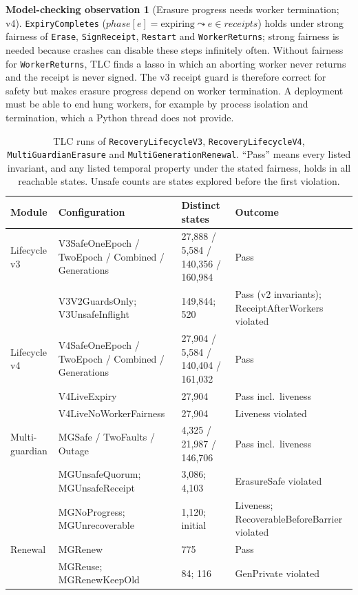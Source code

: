 \documentclass[pdflatex,sn-mathphys-num]{sn-jnl}
\theoremstyle{plain}
\theoremstyle{definition}
\newtheorem{observation}{Model-checking observation}
\newcommand{\code}[1]{\texttt{#1}}
\begin{document}
\begin{observation}[Erasure progress needs worker termination; v4]\label{obs:liveness}
\code{ExpiryCompletes} ($\mathit{phase}[e]=\text{expiring}\leadsto e\in\mathit{receipts}$) holds under strong fairness of \code{Erase}, \code{SignReceipt}, \code{Restart} and \code{WorkerReturns}; strong fairness is needed because crashes can disable these steps infinitely often. Without fairness for \code{WorkerReturns}, TLC finds a lasso in which an aborting worker never returns and the receipt is never signed. The v3 receipt guard is therefore correct for safety but makes erasure progress depend on worker termination. A deployment must be able to end hung workers, for example by process isolation and termination, which a Python thread does not provide.
\end{observation}

\begin{table}[htbp]
\caption{TLC runs of \code{RecoveryLifecycleV3}, \code{RecoveryLifecycleV4}, \code{MultiGuardianErasure} and \code{MultiGenerationRenewal}. ``Pass'' means every listed invariant, and any listed temporal property under the stated fairness, holds in all reachable states. Unsafe counts are states explored before the first violation.}\label{tab:tlc}
\centering\scriptsize
\begin{tabularx}{\linewidth}{@{}p{.19\linewidth}Yp{.17\linewidth}p{.2\linewidth}@{}}\toprule
Module & Configuration & Distinct states & Outcome\\\midrule
Lifecycle v3 & V3SafeOneEpoch / TwoEpoch / Combined / Generations & 27,888 / 5,584 / 140,356 / 160,984 & Pass\\
 & V3V2GuardsOnly; V3UnsafeInflight & 149,844; 520 & Pass (v2 invariants); Receipt\-After\-Workers violated\\
Lifecycle v4 & V4SafeOneEpoch / TwoEpoch / Combined / Generations & 27,904 / 5,584 / 140,404 / 161,032 & Pass\\
 & V4LiveExpiry & 27,904 & Pass incl.\ liveness\\
 & V4LiveNoWorkerFairness & 27,904 & Liveness violated\\
Multi-guardian & MGSafe / TwoFaults / Outage & 4,325 / 21,987 / 146,706 & Pass incl.\ liveness\\
 & MGUnsafeQuorum; MGUnsafeReceipt & 3,086; 4,103 & ErasureSafe violated\\
 & MGNoProgress; MGUnrecoverable & 1,120; initial & Liveness; Recoverable\-Before\-Barrier violated\\
Renewal & MGRenew & 775 & Pass\\
 & MGReuse; MGRenewKeepOld & 84; 116 & GenPrivate violated\\\bottomrule
\end{tabularx}
\end{table}
\end{document}

